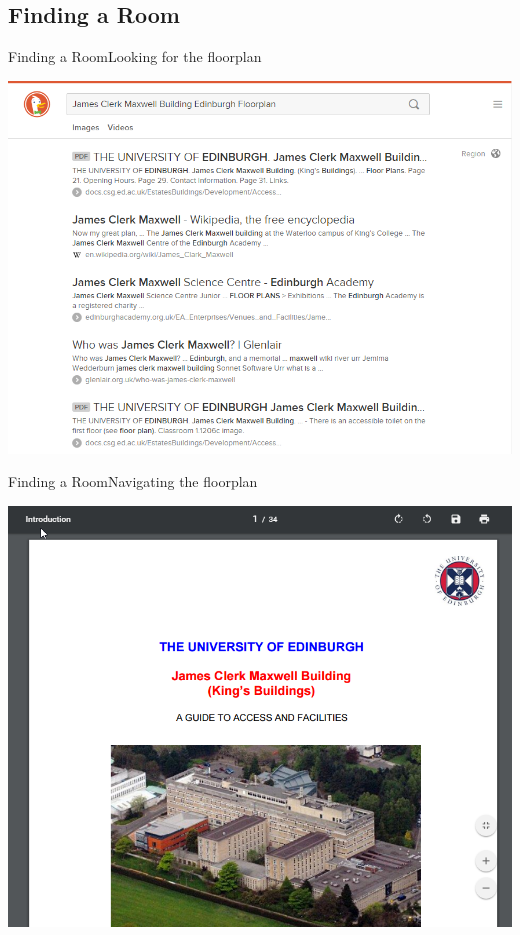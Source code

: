 \documentclass{beamer}
\begin{document}
\subsection{Finding a Room}
\begin{frame}{Finding a Room}{Looking for the floorplan}
  \centerline{\includegraphics[height=0.8\textheight]{floorplansearch.png}}
\end{frame}

\begin{frame}{Finding a Room}{Navigating the floorplan}
  \centerline{\includegraphics[height=0.8\textheight]{pdf1.png}}
\end{frame}
\end{document}
